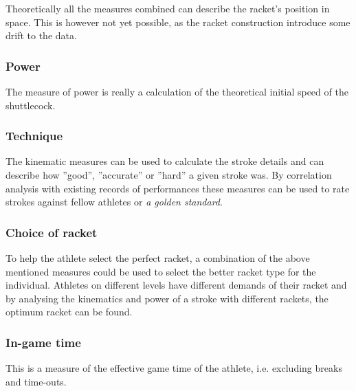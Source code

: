 Theoretically all the measures combined can describe the racket's position in space.
This is however not yet possible, as the racket construction introduce some drift to the data.

\subsubsection*{Power}
The measure of power is really a calculation of the theoretical initial speed of the shuttlecock.

\subsubsection*{Technique}
The kinematic measures can be used to calculate the stroke details and can describe how ''good'', ''accurate'' or ''hard'' a given stroke was.
By correlation analysis with existing records of performances these measures can be used to rate strokes against fellow athletes or \textit{a golden standard}.

\subsubsection*{Choice of racket}
To help the athlete select the perfect racket, a combination of the above mentioned measures could be used to select the better racket type for the individual.
Athletes on different levels have different demands of their racket and by analysing the kinematics and power of a stroke with different rackets, the optimum racket can be found.

\subsubsection*{In-game time}
This is a measure of the effective game time of the athlete, i.e. excluding breaks and time-outs.
